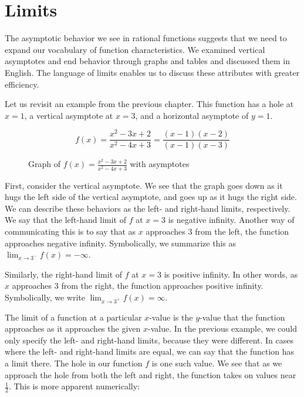 	\chapter{Limits}

The asymptotic behavior we see in rational functions suggests that we need to expand our vocabulary of function characteristics. We examined vertical asymptotes and end behavior through graphs and tables and discussed them in English. The language of limits enables us to discuss these attributes with greater efficiency. 

Let us revisit an example from the previous chapter. This function has a hole at $ x = 1 $, a vertical asymptote at $ x = 3 $, and a horizontal asymptote of $ y = 1 $.

$$ f(x) = \frac{x^2 - 3x + 2}{x^2 - 4x + 3} = \frac{(x-1)(x-2)}{(x-1)(x-3)} $$

\begin{figure}[htbp]
  \centering
  \caption{Graph of \( f(x) = \frac{x^2 - 3x + 2}{x^2 - 4x + 3} \) with asymptotes}
\end{figure}

First, consider the vertical asymptote. We see that the graph goes down as it hugs the left side of the vertical asymptote, and goes up as it hugs the right side. We can describe these behaviors as the left- and right-hand limits, respectively. We say that the left-hand limit of $ f $ at $ x = 3 $ is negative infinity. Another way of communicating this is to say that as $ x $ approaches $ 3 $ from the left, the function approaches negative infinity. Symbolically, we summarize this as $ \lim_{x \rightarrow 3^-} f(x) = -\infty $.

Similarly, the right-hand limit of $ f $ at $ x = 3 $ is positive infinity. In other words, as $ x $ approaches $ 3 $ from the right, the function approaches positive infinity. Symbolically, we write $ \lim_{x \rightarrow 3^+} f(x) = \infty $.

The limit of a function at a particular $ x $-value is the $ y $-value that the function approaches as it approaches the given $ x $-value. In the previous example, we could only specify the left- and right-hand limits, because they were different. In cases where the left- and right-hand limits are equal, we can say that the function has a limit there. The hole in our function $ f $ is one such value. We see that as we approach the hole from both the left and right, the function takes on values near $\frac{1}{2}$. This is more apparent numerically:


